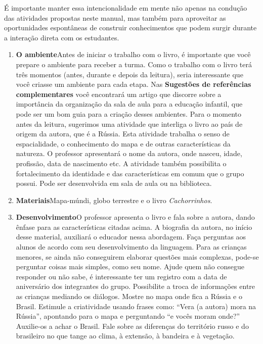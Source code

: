 \documentclass[11pt]{extarticle}
\begin{document}
É importante manter essa intencionalidade em mente não apenas na condução 
das atividades propostas neste manual, mas também para aproveitar as 
oportunidades espontâneas de construir conhecimentos que podem surgir durante 
a interação direta com os estudantes.

\begin{enumerate}
\item \textbf{O ambiente}\quad Antes de iniciar o trabalho com o livro, é importante que você 
prepare o ambiente para receber a turma. Como o trabalho com o livro terá 
três momentos (antes, durante e depois da leitura), seria interessante que você 
criasse um ambiente para cada etapa. Nas \textbf{Sugestões de referências complementares} 
você encontrará um artigo que discorre sobre a importância da organização da sala 
de aula para a educação infantil, que pode ser um bom guia para a criação desses 
ambientes.
Para o momento antes da leitura, sugerimos uma atividade que interliga o livro ao país de origem da  autora, que é a Rússia. Esta atividade trabalha o senso de espacialidade, o conhecimento do mapa e de outras características da natureza. O professor apresentará o nome da autora, onde nasceu, idade, profissão, data de nascimento etc. A atividade também possibilita o fortalecimento da identidade e das características em comum que o grupo possui. Pode ser desenvolvida em sala de aula ou na biblioteca. 

\item \textbf{Materiais}\quad Mapa-múndi, globo terrestre e o livro \textit{Cachorrinhos}. 

\item \textbf{Desenvolvimento}\quad O professor apresenta o livro e fala sobre a autora, dando ênfase para as características citadas acima. A biografia da autora, no início desse material, auxiliará o educador nessa abordagem. Faça perguntas aos alunos de acordo com seu desenvolvimento da linguagem. Para as crianças menores, se ainda não conseguirem elaborar questões mais complexas, pode-se perguntar coisas mais simples, como seu nome. Ajude quem não consegue responder ou não sabe, é interessante ter um registro com a data de aniversário dos integrantes do grupo. Possibilite a troca de informações entre as crianças mediando os diálogos. Mostre no mapa onde fica a Rússia e o Brasil. Estimule a criatividade usando frases como: ``Vera (a autora) mora na Rússia'', apontando para o mapa e perguntando ``e vocês moram onde?'' Auxilie-os a achar o Brasil. Fale sobre as diferenças do território russo e do brasileiro no que tange ao clima, à  extensão, à bandeira e à vegetação.  


\end{enumerate}
\end{document}

